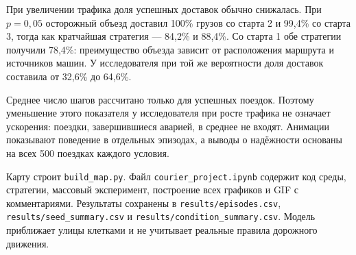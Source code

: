 \documentclass[12pt,a4paper]{article}
\begin{document}
При увеличении трафика доля успешных доставок обычно снижалась. При $p=0{,}05$ осторожный объезд доставил 100\% грузов со старта 2 и 99,4\% со старта 3, тогда как кратчайшая стратегия --- 84,2\% и 88,4\%. Со старта 1 обе стратегии получили 78,4\%: преимущество объезда зависит от расположения маршрута и источников машин. У исследователя при той же вероятности доля доставок составила от 32,6\% до 64,6\%.

Среднее число шагов рассчитано только для успешных поездок. Поэтому уменьшение этого показателя у исследователя при росте трафика не означает ускорения: поездки, завершившиеся аварией, в среднее не входят. Анимации показывают поведение в отдельных эпизодах, а выводы о надёжности основаны на всех 500 поездках каждого условия.

Карту строит \texttt{build\_map.py}. Файл \texttt{courier\_project.ipynb} содержит код среды, стратегии, массовый эксперимент, построение всех графиков и GIF с комментариями. Результаты сохранены в \texttt{results/episodes.csv}, \texttt{results/seed\_summary.csv} и \texttt{results/condition\_summary.csv}. Модель приближает улицы клетками и не учитывает реальные правила дорожного движения.
\end{document}
